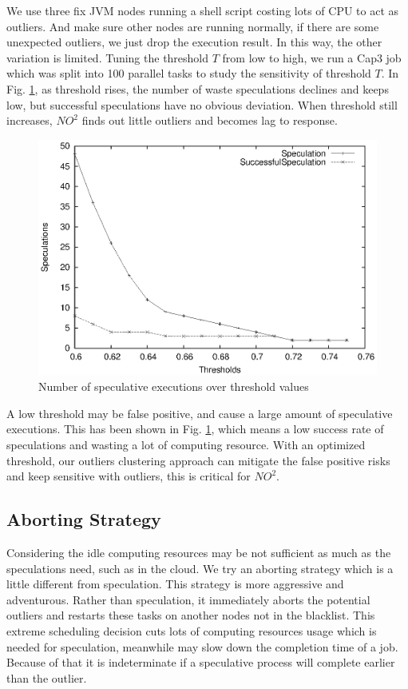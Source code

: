 We use three fix JVM nodes running a shell script costing lots of CPU to act as outliers. And make sure other nodes are running normally, if there are some unexpected outliers, we just drop the execution result. In this way, the other variation is limited. Tuning the threshold $T$ from low to high, we run a Cap3 job which was split into 100 parallel tasks to study the sensitivity of threshold $T$. In Fig. \ref{figure:thresholdtuning}, as threshold rises, the number of waste speculations declines and keeps low, but successful speculations have no obvious deviation. When threshold still increases, $NO^2$ finds out little outliers and becomes lag to response.

\begin{figure}
\centering
\includegraphics[width=0.9\columnwidth]{figures/threshold&speculation.eps}
\caption{Number of speculative executions over threshold values}
\label{figure:thresholdtuning}
\end{figure}

A low threshold may be false positive, and cause a large amount of speculative executions. This has been shown in Fig.  \ref{figure:thresholdtuning}, which means a low success rate of speculations and wasting a lot of computing resource. With an optimized threshold, our outliers clustering approach can mitigate the false positive risks and keep sensitive with outliers, this is critical for $NO^2$.

\subsection{Aborting Strategy}

Considering the idle computing resources may be not sufficient as much as the speculations need, such as in the cloud. We try an aborting strategy which is a little different from speculation. This strategy is more aggressive and adventurous. Rather than speculation, it immediately aborts the potential outliers and restarts these tasks on another nodes not in the blacklist. This extreme scheduling decision cuts lots of computing resources usage which is needed for speculation, meanwhile may slow down the completion time of a job. Because of that it is indeterminate if a speculative process will complete earlier than the outlier.

